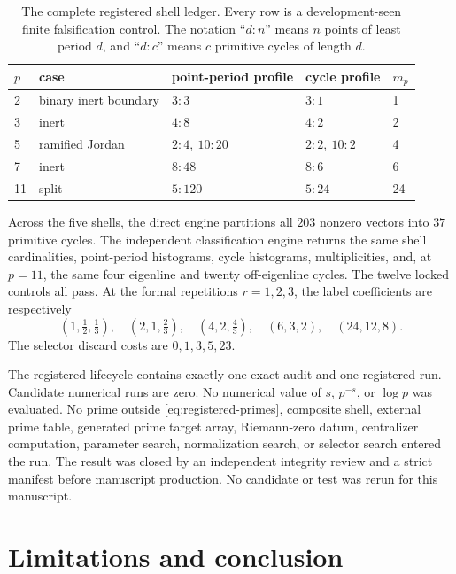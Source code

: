 \documentclass[11pt]{article}
\theoremstyle{definition}
\theoremstyle{remark}
\begin{document}
\begin{table}[ht]
\centering
\caption{The complete registered shell ledger.  Every row is a
development-seen finite falsification control.  The notation
``\(d:n\)'' means \(n\) points of least period \(d\), and ``\(d:c\)'' means
\(c\) primitive cycles of length \(d\).}
\label{tab:registered-ledger}
\footnotesize
\begin{tabularx}{\textwidth}{C{0.07\textwidth} Y C{0.18\textwidth} C{0.18\textwidth} C{0.09\textwidth}}
\toprule
\(p\) & case & point-period profile & cycle profile & \(m_p\) \\
  & binary inert boundary & \(3:3\) & \(3:1\) & 1 \\
3  & inert                 & \(4:8\) & \(4:2\) & 2 \\
5  & ramified Jordan       & \(2:4,\ 10:20\) & \(2:2,\ 10:2\) & 4 \\
7  & inert                 & \(8:48\) & \(8:6\) & 6 \\
11 & split                 & \(5:120\) & \(5:24\) & 24 \\
\bottomrule
\end{tabularx}
\end{table}

Across the five shells, the direct engine partitions all \(203\) nonzero
vectors into \(37\) primitive cycles.  The independent classification
engine returns the same shell cardinalities, point-period histograms, cycle
histograms, multiplicities, and, at \(p=11\), the same four eigenline and
twenty off-eigenline cycles.  The twelve locked controls all pass.  At the
formal repetitions \(r=1,2,3\), the label coefficients are respectively
\[
  (1,\tfrac12,\tfrac13),\quad
  (2,1,\tfrac23),\quad
  (4,2,\tfrac43),\quad
  (6,3,2),\quad
  (24,12,8).
\]
The selector discard costs are \(0,1,3,5,23\).

The registered lifecycle contains exactly one exact audit and one
registered run.  Candidate numerical runs are zero.  No numerical value of
\(s\), \(p^{-s}\), or \(\log p\) was evaluated.  No prime outside
\eqref{eq:registered-primes}, composite shell, external prime table,
generated prime target array, Riemann-zero datum, centralizer computation,
parameter search, normalization search, or selector search entered the
run.  The result was closed by an independent integrity review and a strict
manifest before manuscript production.  No candidate or test was rerun for
this manuscript.

\section{Limitations and conclusion}
\label{sec:conclusion}
\end{document}
